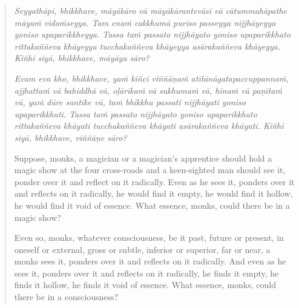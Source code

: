 \begin{quote}
\emph{Seyyathāpi, bhikkhave, māyākāro vā māyākārantevāsī vā cātummahāpathe māyaṁ vidaṁseyya. Tam enaṁ cakkhumā puriso passeyya nijjhāyeyya yoniso upaparikkheyya. Tassa taṁ passato nijjhāyato yoniso upaparikkhato rittakaññeva khāyeyya tucchakaññeva khāyeyya asārakaññeva khāyeyya. Kiñhi siyā, bhikkhave, māyāya sāro?}

\emph{Evam eva kho, bhikkhave, yaṁ kiñci viññāṇaṁ atītānāgatapaccuppannaṁ, ajjhattaṁ vā bahiddhā vā, oḷārikaṁ vā sukhumaṁ vā, hīnaṁ vā paṇītaṁ vā, yaṁ dūre santike vā, taṁ bhikkhu passati nijjhāyati yoniso upaparikkhati. Tassa taṁ passato nijjhāyato yoniso upaparikkhato rittakaññeva khāyati tucchakaññeva khāyati asārakaññeva khāyati. Kiñhi siyā, bhikkhave, viññāṇe sāro?}

Suppose, monks, a magician or a magician's apprentice should hold a magic show at the four cross-roads and a keen-sighted man should see it, ponder over it and reflect on it radically. Even as he sees it, ponders over it and reflects on it radically, he would find it empty, he would find it hollow, he would find it void of essence. What essence, monks, could there be in a magic show?

Even so, monks, whatever consciousness, be it past, future or present, in oneself or external, gross or subtle, inferior or superior, far or near, a monks sees it, ponders over it and reflects on it radically. And even as he sees it, ponders over it and reflects on it radically, he finds it empty, he finds it hollow, he finds it void of essence. What essence, monks, could there be in a consciousness?
\end{quote}
